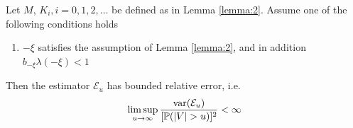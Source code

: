 \documentclass[aoas,preprint]{imsart}
\numberwithin{equation}{section}
\theoremstyle{plain}
\begin{document}
  

\begin{theorem}
  Let $M$, $K_i, i=0, 1, 2, \dots$ be defined as in Lemma
  \ref{lemma:2}. Assume one of the following conditions holds
  \begin{enumerate}[1)]
    \item $-\xi$ satisfies the assumption of Lemma \ref{lemma:2}, and in
      addition $b_{-\xi} \lambda(-\xi) < 1$
  \end{enumerate}
  Then the estimator $\mathcal E_u$ has bounded relative error, i.e.
  \begin{equation*}
    \limsup_{u \to \infty} {\text{var}(\mathcal E_u) \over [\mathbb{P}(|V| > u)]^2} < \infty
  \end{equation*}
\end{theorem}
\end{document}
